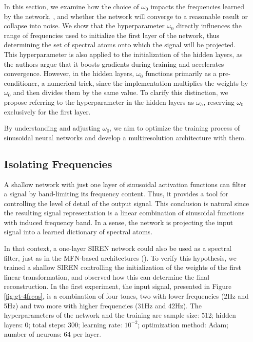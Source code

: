 In this section, we examine how the choice of \(\omega_0\) impacts the frequencies learned by the network, , and whether the network will converge to a reasonable result or collapse into noise. We show that the hyperparameter \(\omega_0\) directly influences the range of frequencies used to initialize the first layer of the network, thus determining the set of spectral atoms onto which the signal will be projected. This hyperparameter is also applied to the initialization of the hidden layers, as the authors argue that it boosts gradients during training and accelerates convergence. However, in the hidden layers, \(\omega_0\) functions primarily as a pre-conditioner, a numerical trick, since the implementation multiplies the weights by \(\omega_0\) and then divides them by the same value. To clarify this distinction, we propose referring to the hyperparameter in the hidden layers as \(\omega_h\), reserving \(\omega_0\) exclusively for the first layer.

By understanding and adjusting \(\omega_0\), we aim to optimize the training process of sinusoidal neural networks and develop a multiresolution architecture with them.


\subsection{Isolating Frequencies}

A shallow network with just one layer of sinusoidal activation functions can filter a signal by band-limiting its frequency content. Thus, it provides a tool for controlling the level of detail of the output signal. This conclusion is natural since the resulting signal representation is a linear combination of sinusoidal functions with induced frequency band. In a sense, the network is projecting the input signal into a learned dictionary of spectral atoms.

In that context, a one-layer SIREN network could also be used as a spectral filter, just as in the MFN-based architectures (\cite{fathony2020multiplicative}). To verify this hypothesis, we trained a shallow SIREN controlling the initialization of the weights of the first linear transformation, and observed how this can determine the final reconstruction. In the first experiment, the input signal, presented in Figure \ref{fig:gt-4freqs}, is a combination of four tones, two with lower frequencies (2Hz and 5Hz) and two more with higher frequencies (31Hz and 42Hz). The hyperparameters of the network and the training are sample size: 512; hidden layers: 0; total steps: 300; learning rate: $10^{-2}$; optimization method: Adam; number of neurons: 64 per layer. 

